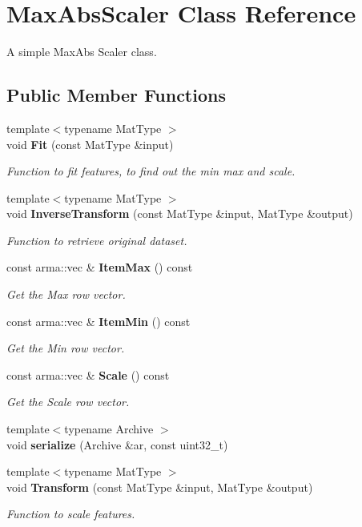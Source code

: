 \section{Max\+Abs\+Scaler Class Reference}
\label{classmlpack_1_1data_1_1MaxAbsScaler}


A simple Max\+Abs Scaler class.  


\subsection*{Public Member Functions}
\begin{DoxyCompactItemize}
\item 
{\footnotesize template$<$typename Mat\+Type $>$ }\\void \textbf{ Fit} (const Mat\+Type \&input)
\begin{DoxyCompactList}\small\item\em Function to fit features, to find out the min max and scale. \end{DoxyCompactList}\item 
{\footnotesize template$<$typename Mat\+Type $>$ }\\void \textbf{ Inverse\+Transform} (const Mat\+Type \&input, Mat\+Type \&output)
\begin{DoxyCompactList}\small\item\em Function to retrieve original dataset. \end{DoxyCompactList}\item 
const arma\+::vec \& \textbf{ Item\+Max} () const
\begin{DoxyCompactList}\small\item\em Get the Max row vector. \end{DoxyCompactList}\item 
const arma\+::vec \& \textbf{ Item\+Min} () const
\begin{DoxyCompactList}\small\item\em Get the Min row vector. \end{DoxyCompactList}\item 
const arma\+::vec \& \textbf{ Scale} () const
\begin{DoxyCompactList}\small\item\em Get the Scale row vector. \end{DoxyCompactList}\item 
{\footnotesize template$<$typename Archive $>$ }\\void \textbf{ serialize} (Archive \&ar, const uint32\+\_\+t)
\item 
{\footnotesize template$<$typename Mat\+Type $>$ }\\void \textbf{ Transform} (const Mat\+Type \&input, Mat\+Type \&output)
\begin{DoxyCompactList}\small\item\em Function to scale features. \end{DoxyCompactList}\end{DoxyCompactItemize}



